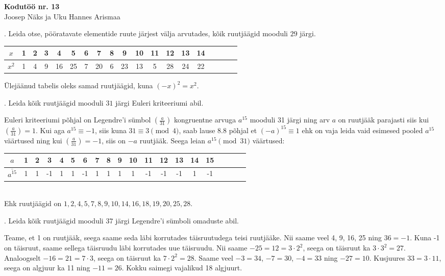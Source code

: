 \documentclass[a4paper, 10pt]{article}
\newcommand{\w}{\overline}
\newcommand{\leg}[2]{\left(\frac{#1}{#2}\right)}
\begin{document}
\begin{center}
\Large\textbf{Kodutöö nr. 13}\\
\small{Joosep Näks ja Uku Hannes Arismaa}
\end{center}


\bigskip

. Leida otse, pööratavate elementide ruute järjest välja arvutades, kõik ruutj\"a\"agid mooduli $29$ j\"argi.

\bigskip

\begin{tabular}{c|cccccccccccccccccc}
     $x$& 1&2&3&4&5&6&7&8&9&10& 11&12&13&14 \\
     \hline
     $x^2$& 1&4&9&16&25&7&20&6&23&13& 5&28&24&22
\end{tabular}

Ülejäänud tabelis oleks samad ruutjäägid, kuna $(-x)^2=x^2$.
\bigskip

. Leida kõik ruutj\"a\"agid mooduli $31$ j\"argi Euleri kriteeriumi abil.

\bigskip
Euleri kriteeriumi põhjal on Legendre'i sümbol $\leg a{31}$ kongruentne arvuga $a^{15}$ mooduli 31 järgi ning arv $a$ on ruutjääk parajasti siis kui $\leg a{31}=1$. Kui aga $a^{15}\equiv-1$, siis kuna $31\equiv3\pmod4$, saab lause 8.8 põhjal et $(-a)^{15}\equiv1$ ehk on vaja leida vaid esimesed pooled $a^{15}$ väärtused ning kui $\leg a{31}=-1$, siis on $-a$ ruutjääk. Seega leian $a^{15}\pmod{31}$ väärtused:\\
\begin{tabular}{c|ccccccccccccccccccc}
$a$&1&2&3&4&5&6&7&8&9&10&11&12&13&14&15\\
\hline
$\w{a^{15}}$&1&1&-1&1&1&-1&1&1&1&1&-1&-1&-1&1&-1
\end{tabular}\\
Ehk ruutjäägid on $1,2,4,5,7,8,9,10,14,16,18,19,20,25,28$.
\bigskip

. Leida kõik ruutj\"a\"agid mooduli $37$ j\"argi Legendre'i sümboli omaduste abil.

\bigskip
Teame, et 1 on ruutjääk, seega saame seda läbi korrutades täisruutudega teisi ruutjääke. Nii saame veel 4, 9, 16, 25 ning $36=-1$. Kuna -1 on täisruut, saame sellega täisruudu läbi korrutades uue täisruudu. Nii saame $-25=12=3\cdot2^2$, seega on täisruut ka $3\cdot 3^2=27$. Analoogselt $-16=21=7\cdot3$, seega on täisruut ka $7\cdot2^2=28$. Saame veel $-3=34$, $-7=30$, $-4=33$ ning $-27=10$. Kusjuures $33=3\cdot11$, seega on algjuur ka 11 ning $-11=26$. Kokku saimegi vajalikud 18 algjuurt.
\end{document}
